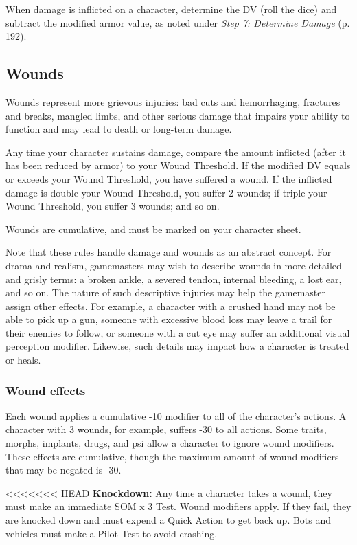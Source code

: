 When damage is inflicted on a character, determine the DV (roll the dice) and subtract the modified armor value, as noted under \emph{Step 7: Determine Damage} (p. 192).

\subsection{Wounds}
\label{sec:wounds}

Wounds represent more grievous injuries: bad cuts and hemorrhaging, fractures and breaks, mangled limbs, and other serious damage that impairs your ability to function and may lead to death or long-term damage.

Any time your character sustains damage, compare the amount inflicted (after it has been reduced by armor) to your Wound Threshold. If the modified DV equals or exceeds your Wound Threshold, you have suffered a wound. If the inflicted damage is double your Wound Threshold, you suffer 2 wounds; if triple your Wound Threshold, you suffer 3 wounds; and so on.

Wounds are cumulative, and must be marked on your character sheet.

Note that these rules handle damage and wounds as an abstract concept. For drama and realism, gamemasters may wish to describe wounds in more detailed and grisly terms: a broken ankle, a severed tendon, internal bleeding, a lost ear, and so on. The nature of such descriptive injuries may help the gamemaster assign other effects. For example, a character with a crushed hand may not be able to pick up a gun, someone with excessive blood loss may leave a trail for their enemies to follow, or someone with a cut eye may suffer an additional visual perception modifier. Likewise, such details may impact how a character is treated or heals.

\subsubsection{Wound effects}

Each wound applies a cumulative -10 modifier to all of the character’s actions. A character with 3 wounds, for example, suffers -30 to all actions. Some traits, morphs, implants, drugs, and psi allow a character to ignore wound modifiers. These effects are cumulative, though the maximum amount of wound modifiers that may be negated is -30.

<<<<<<< HEAD
\textbf{Knockdown:} Any time a character takes a wound, they must make an immediate SOM x 3 Test. Wound modifiers apply. If they fail, they are knocked down and must expend a Quick Action to get back up. Bots and vehicles must make a Pilot Test to avoid crashing.

